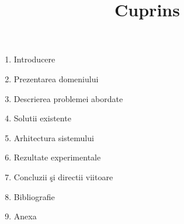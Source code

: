 \documentclass[11pt,a4paper]{article}
\title{Cuprins}
\author{}
\date{}
\begin{document}
\maketitle

\begin{enumerate}[noitemsep, label=\arabic*.]
    \item Introducere
    \item Prezentarea domeniului
    \item Descrierea problemei abordate 
    \item Solutii existente
    \item Arhitectura sistemului
    \item Rezultate experimentale

    \item Concluzii şi directii viitoare
    \item Bibliografie
    \item Anexa
\end{enumerate}
\end{document}
